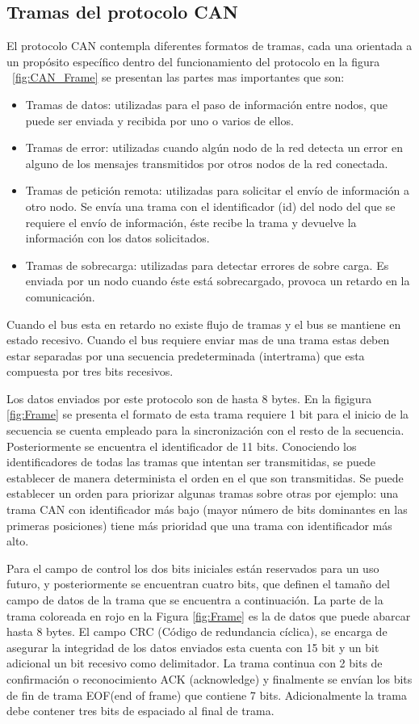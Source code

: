 \subsection{Tramas del protocolo CAN}
El protocolo CAN contempla diferentes formatos de tramas, cada una orientada a un propósito específico dentro del funcionamiento del protocolo en la figura ~\ref{fig:CAN_Frame} se presentan las partes mas importantes  que son:
\begin{itemize}
    \item Tramas de datos: utilizadas para el paso de información entre nodos, que puede ser  enviada y recibida por uno o varios de ellos.
    \item Tramas de error:  utilizadas cuando algún nodo de la red detecta un error en alguno de los mensajes transmitidos por otros nodos de la red conectada.
    \item Tramas de petición remota: utilizadas para solicitar el envío de información a otro nodo. Se envía una trama con el identificador (id) del nodo del que se requiere el envío de información, éste recibe la trama y devuelve la información con los datos solicitados. 
    \item Tramas de sobrecarga: utilizadas para detectar errores de sobre carga.  Es enviada por un nodo cuando éste está sobrecargado, provoca un retardo en la comunicación.
\end{itemize}

Cuando el bus esta en retardo no existe flujo de tramas y el bus se mantiene en estado recesivo. Cuando el bus requiere enviar mas de una trama estas deben estar separadas por una secuencia predeterminada (intertrama) que esta compuesta por tres bits recesivos.

Los datos enviados por este protocolo son de hasta 8 bytes. En la figigura \ref{fig:Frame} se presenta el formato de esta trama requiere 1 bit  para el inicio de la secuencia se cuenta empleado para la sincronización con el resto de la secuencia. Posteriormente se encuentra el identificador de 11 bits. Conociendo los identificadores de todas las tramas que intentan ser transmitidas, se puede establecer de manera determinista el orden en el que son transmitidas. Se puede establecer un orden para priorizar algunas tramas sobre otras por ejemplo: una trama CAN con identificador más bajo (mayor número de bits dominantes en las primeras posiciones) tiene más prioridad que una trama con identificador más alto. 

Para el campo de control los dos bits iniciales están reservados para un uso futuro, y posteriormente
se encuentran cuatro bits, que definen el tamaño del campo de datos de la trama que se encuentra a
continuación. La parte de la trama coloreada en rojo en la Figura \ref{fig:Frame} es la de datos que puede abarcar hasta 8 bytes. El campo CRC (Código de redundancia cíclica), se encarga de asegurar la integridad de los datos enviados esta cuenta con 15 bit y un bit adicional un bit recesivo como delimitador. La trama continua con 2 bits de confirmación o reconocimiento ACK (acknowledge) y finalmente se envían los bits de fin de trama EOF(end of frame) que contiene 7 bits. Adicionalmente la trama debe contener tres bits de espaciado al final de trama.

